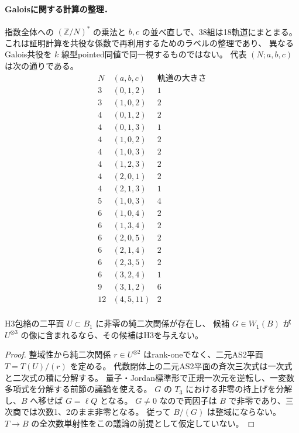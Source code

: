 \paragraph{Galoisに関する計算の整理．}
指数全体への $(\mathbb Z/N)^*$ の乗法と $b,c$ の並べ直しで、38組は18軌道にまとまる。
これは証明計算を共役な係数で再利用するためのラベルの整理であり、
異なるGalois共役を $k$ 線型pointed同値で同一視するものではない。
代表 $(N;a,b,c)$ は次の通りである。
\[
\begin{array}{c|c|r}
 N&(a,b,c)&\text{軌道の大きさ}\\\hline
3&(0,1,2)&1\\
3&(1,0,2)&2\\
4&(0,1,2)&2\\
4&(0,1,3)&1\\
4&(1,0,2)&2\\
4&(1,0,3)&2\\
4&(1,2,3)&2\\
4&(2,0,1)&2\\
4&(2,1,3)&1\\
5&(1,0,3)&4\\
6&(1,0,4)&2\\
6&(1,3,4)&2\\
6&(2,0,5)&2\\
6&(2,1,4)&2\\
6&(2,3,5)&2\\
6&(3,2,4)&1\\
9&(3,1,2)&6\\
12&(4,5,11)&2\\
\end{array}
\]

\begin{lemma}
\label{lem:cubic-pure-AS2-cubic-factor}
H3包絡の二平面 $U\subset B_1$ に非零の純二次関係が存在し、
候補 $G\in W_1(B)$ が $U^{\otimes3}$ の像に含まれるなら、その候補はH3を与えない。
\end{lemma}
\begin{proof}
整域性から純二次関係 $r\in U^{\otimes2}$ はrank-oneでなく、二元AS2平面
$T=T(U)/(r)$ を定める。
代数閉体上の二元AS2平面の斉次三次式は一次式と二次式の積に分解する。
量子・Jordan標準形で正規一次元を逆転し、一変数多項式を分解する前節の議論を使える。
$G$ の $T_3$ における非零の持上げを分解し、$B$ へ移せば $G=\ell Q$ となる。
$G\ne0$ なので両因子は $B$ で非零であり、三次商では次数1、2のまま非零となる。
従って $B/(G)$ は整域にならない。
$T\to B$ の全次数単射性をこの議論の前提として仮定していない。
\end{proof}

